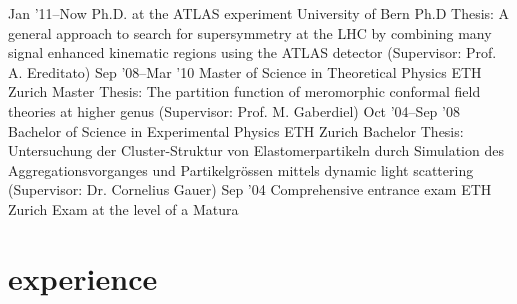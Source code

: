 \documentclass[]{cv} %
\begin{document}
\begin{entrylist}
\entry
{Jan '11--Now}
{Ph.D. {\normalfont at the} ATLAS experiment}
{University of Bern}
{Ph.D Thesis: A general approach to search for supersymmetry at the LHC by combining many signal enhanced kinematic regions using the ATLAS detector (Supervisor:
  Prof. A. Ereditato)}
\entry
{Sep '08--Mar '10}
{Master {\normalfont of Science in} Theoretical Physics}
{ETH Zurich}
{Master Thesis: The partition function of meromorphic conformal field theories at higher genus (Supervisor: Prof. M. Gaberdiel)}
\entry
{Oct '04--Sep '08}
{Bachelor {\normalfont of Science in} Experimental Physics}
{ETH Zurich}
{Bachelor Thesis: Untersuchung der Cluster-Struktur von Elastomerpartikeln durch Simulation des Aggregationsvorganges und Partikelgr{\"o}ssen mittels dynamic
light scattering (Supervisor: Dr. Cornelius Gauer)}
\entry
{Sep '04}
{Comprehensive entrance exam}
{ETH Zurich}
{Exam at the level of a Matura}
\end{entrylist}

\section{experience}
\end{document}
